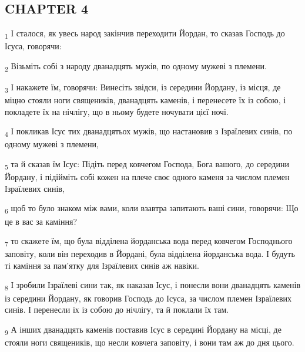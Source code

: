 \subsection{CHAPTER 4}
\begin{tcolorbox}
\textsubscript{1} І сталося, як увесь народ закінчив переходити Йордан, то сказав Господь до Ісуса, говорячи:
\end{tcolorbox}
\begin{tcolorbox}
\textsubscript{2} Візьміть собі з народу дванадцять мужів, по одному мужеві з племени.
\end{tcolorbox}
\begin{tcolorbox}
\textsubscript{3} І накажете їм, говорячи: Винесіть звідси, із середини Йордану, із місця, де міцно стояли ноги священиків, дванадцять каменів, і перенесете їх із собою, і покладете їх на нічлігу, що в ньому будете ночувати цієї ночі.
\end{tcolorbox}
\begin{tcolorbox}
\textsubscript{4} І покликав Ісус тих дванадцятьох мужів, що настановив з Ізраїлевих синів, по одному мужеві з племени,
\end{tcolorbox}
\begin{tcolorbox}
\textsubscript{5} та й сказав їм Ісус: Підіть перед ковчегом Господа, Бога вашого, до середини Йордану, і підійміть собі кожен на плече своє одного каменя за числом племен Ізраїлевих синів,
\end{tcolorbox}
\begin{tcolorbox}
\textsubscript{6} щоб то було знаком між вами, коли взавтра запитають ваші сини, говорячи: Що це в вас за каміння?
\end{tcolorbox}
\begin{tcolorbox}
\textsubscript{7} то скажете їм, що була відділена йорданська вода перед ковчегом Господнього заповіту, коли він переходив в Йордані, була відділена йорданська вода. І будуть ті каміння за пам'ятку для Ізраїлевих синів аж навіки.
\end{tcolorbox}
\begin{tcolorbox}
\textsubscript{8} І зробили Ізраїлеві сини так, як наказав Ісус, і понесли вони дванадцять каменів із середини Йордану, як говорив Господь до Ісуса, за числом племен Ізраїлевих синів. І перенесли їх із собою до нічлігу, та й поклали їх там.
\end{tcolorbox}
\begin{tcolorbox}
\textsubscript{9} А інших дванадцять каменів поставив Ісус в середині Йордану на місці, де стояли ноги священиків, що несли ковчега заповіту, і вони там аж до дня цього.
\end{tcolorbox}

